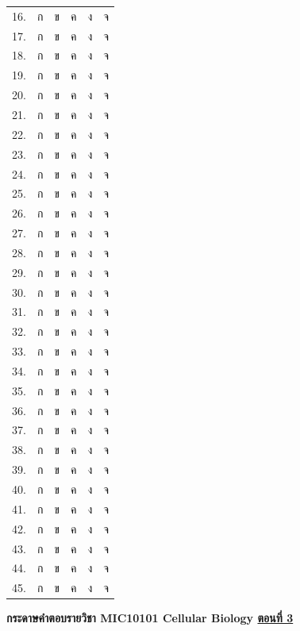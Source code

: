 \documentclass[12pt, a4paper]{exam}
\begin{document}
\begin{center}
\setlength{\tabcolsep}{20pt}
\renewcommand{\arraystretch}{1.35}
\begin{tabular}{l c c c c c}
16. & ก & ข & ค & ง & จ \\
17. & ก & ข & ค & ง & จ \\
18. & ก & ข & ค & ง & จ \\
19. & ก & ข & ค & ง & จ \\
20. & ก & ข & ค & ง & จ \\
21. & ก & ข & ค & ง & จ \\
22. & ก & ข & ค & ง & จ \\
23. & ก & ข & ค & ง & จ \\
24. & ก & ข & ค & ง & จ \\
25. & ก & ข & ค & ง & จ \\
26. & ก & ข & ค & ง & จ \\
27. & ก & ข & ค & ง & จ \\
28. & ก & ข & ค & ง & จ \\
29. & ก & ข & ค & ง & จ \\
30. & ก & ข & ค & ง & จ \\
31. & ก & ข & ค & ง & จ \\
32. & ก & ข & ค & ง & จ \\
33. & ก & ข & ค & ง & จ \\
34. & ก & ข & ค & ง & จ \\
35. & ก & ข & ค & ง & จ \\
36. & ก & ข & ค & ง & จ \\
37. & ก & ข & ค & ง & จ \\
38. & ก & ข & ค & ง & จ \\
39. & ก & ข & ค & ง & จ \\
40. & ก & ข & ค & ง & จ \\
41. & ก & ข & ค & ง & จ \\
42. & ก & ข & ค & ง & จ \\
43. & ก & ข & ค & ง & จ \\
44. & ก & ข & ค & ง & จ \\
45. & ก & ข & ค & ง & จ \\
\end{tabular}
\end{center}
\newpage
\vspace{0.5cm}
\begin{center}
\textbf{กระดาษคำตอบรายวิชา MIC10101 Cellular Biology \underline{ตอนที่ 3}}
\label{ans_part_3}
\end{center}
\vspace{0.5cm}
\end{document}
